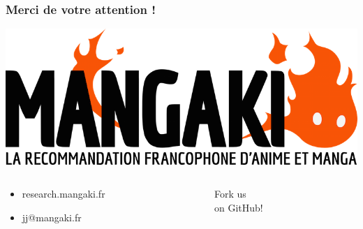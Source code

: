 \documentclass[handout]{beamer}
\begin{document}
\begin{frame}
	\frametitle{Merci de votre attention !}
	\includegraphics[width=\linewidth]{figures/mangaki.png}
	\vspace{5mm}
	\begin{columns}
	\begin{column}{0.5\textwidth}
	\begin{itemize}
	\item research.mangaki.fr\bigskip\\
	\item jj@mangaki.fr
	\end{itemize}\bigskip
	\end{column}
	\begin{column}{0.5\textwidth}
	\centering
	\huge Fork us\\on GitHub\!!
	\end{column}
	\end{columns}
	
\end{frame}
\end{document}
